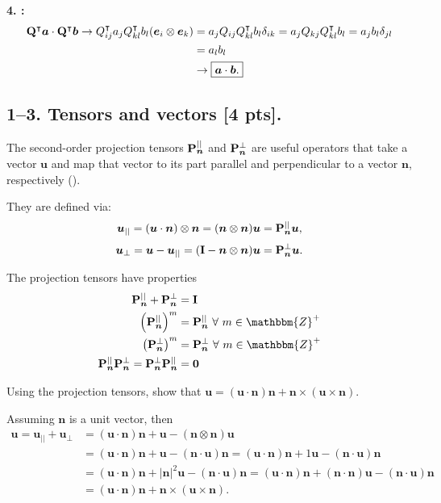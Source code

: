 \textbf{4. :}
\begin{align*}
    \mathbf{Q}^\intercal\bm{a} \cdot \mathbf{Q}^\intercal\bm{b} \rightarrow Q_{ij}^\intercal a_j Q_{kl}^\intercal b_l (\bm{e}_i \otimes \bm{e}_k) &= a_j Q_{ij} Q_{kl}^\intercal b_l \delta_{ik} = a_j Q_{kj} Q_{kl}^\intercal b_l = a_j b_l \delta_{jl}\\
    &= a_l b_l\\
    &\rightarrow \boxed{\bm{a} \cdot \bm{b}.}
\end{align*}

\newpage
\subsection*{1--3. \textbf{Tensors and vectors} [4 pts].}
The second-order projection tensors $\mathbf{P}_{\bm{n}}^{||}$ and $\mathbf{P}_{\bm{n}}^{\perp}$ are useful operators that take a vector $\bm{u}$ and map that vector to its part parallel and perpendicular to a vector $\bm{n}$, respectively (\cite{holzapfelNonlinearSolidMechanics2002}).

They are defined via:
\begin{equation*}
    \bm{u}_{||} = (\bm{u} \cdot \bm{n}) \otimes \bm{n} = (\bm{n} \otimes \bm{n}) \bm{u} = \mathbf{P}_{\bm{n}}^{||} \bm{u},
\end{equation*}
\begin{equation*}
    \bm{u}_{\perp} = \bm{u} - \bm{u}_{||} = (\mathbf{I} - \bm{n} \otimes \bm{n}) \bm{u} = \mathbf{P}_{\bm{n}}^{\perp} \bm{u}.
\end{equation*}

The projection tensors have properties
\begin{align*}
    \bn{P}_{\bm{n}}^{||} + \bn{P}_{\bm{n}}^{\perp} &= \bn{I} \\
    \left(\bn{P}_{\bm{n}}^{||} \right)^m &= \bn{P}_{\bm{n}}^{||} ~\forall ~m \in \mathbbm{Z}^+\\
    \left(\bn{P}_{\bm{n}}^{\perp} \right)^m &= \bn{P}_{\bm{n}}^{\perp} ~\forall ~m \in \mathbbm{Z}^+\\
    \bn{P}_{\bm{n}}^{||} \bn{P}_{\bm{n}}^{\perp} = \bn{P}_{\bm{n}}^{\perp} \bn{P}_{\bm{n}}^{||}  &= \bn{0}
\end{align*}

Using the projection tensors, show that $\bm{u} = (\bm{u} \cdot \bm{n}) \bm{n} + \bm{n} \times (\bm{u} \times \bm{n} )$.

Assuming $\bm{n}$ is a unit vector, then
\begin{align*}
    \bm{u} = \bm{u}_{||} + \bm{u}_{\perp} &= (\bm{u} \cdot \bm{n} ) \bm{n} + \bm{u} - ( \bm{n} \otimes \bm{n} ) \bm{u}\\
    &= (\bm{u} \cdot \bm{n} ) \bm{n} + \bm{u} - (\bm{n} \cdot \bm{u}) \bm{n} = (\bm{u} \cdot \bm{n} ) \bm{n} + 1 \bm{u} - (\bm{n} \cdot \bm{u}) \bm{n}\\
    &= (\bm{u} \cdot \bm{n} ) \bm{n} + |\bm{n}|^2 \bm{u} - (\bm{n} \cdot \bm{u}) \bm{n} =  (\bm{u} \cdot \bm{n} ) \bm{n} + (\bm{n} \cdot \bm{n}) \bm{u} - (\bm{n} \cdot \bm{u}) \bm{n}\\
    &= \boxed{(\bm{u} \cdot \bm{n} ) \bm{n} + \bm{n} \times (\bm{u} \times \bm{n}).}
\end{align*}

